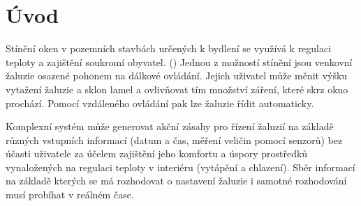 \chapter{Úvod} \label{chap:introduction}


Stínění oken v pozemních stavbách určených k bydlení se využívá k regulaci teploty a zajištění soukromí obyvatel. (\cite{lubinova:stineni}) Jednou z možností stínění jsou venkovní žaluzie osazené pohonem na dálkové ovládání. Jejich uživatel může měnit výšku vytažení žaluzie a sklon lamel a ovlivňovat tím množství záření, které skrz okno prochází. Pomocí vzdáleného ovládání pak lze žaluzie řídit automaticky.

Komplexní systém může generovat akční zásahy pro řízení žaluzií na základě různých vstupních informací (datum a čas, měření veličin pomocí senzorů) bez účasti uživatele za účelem zajištění jeho komfortu a úspory prostředků vynaložených na regulaci teploty v interiéru (vytápění a chlazení). Sběr informací na základě kterých se má rozhodovat o nastavení žaluzie i samotné rozhodování musí probíhat v reálném čase.

